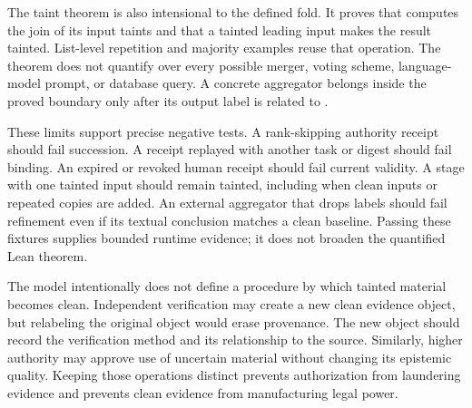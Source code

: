 The taint theorem is also intensional to the defined fold. It proves that  computes the join of its input taints and that a tainted leading input makes the result tainted. List-level repetition and majority examples reuse that operation. The theorem does not quantify over every possible merger, voting scheme, language-model prompt, or database query. A concrete aggregator belongs inside the proved boundary only after its output label is related to .

These limits support precise negative tests. A rank-skipping authority receipt should fail succession. A receipt replayed with another task or digest should fail binding. An expired or revoked human receipt should fail current validity. A stage with one tainted input should remain tainted, including when clean inputs or repeated copies are added. An external aggregator that drops labels should fail refinement even if its textual conclusion matches a clean baseline. Passing these fixtures supplies bounded runtime evidence; it does not broaden the quantified Lean theorem.

The model intentionally does not define a procedure by which tainted material becomes clean. Independent verification may create a new clean evidence object, but relabeling the original object would erase provenance. The new object should record the verification method and its relationship to the source. Similarly, higher authority may approve use of uncertain material without changing its epistemic quality. Keeping those operations distinct prevents authorization from laundering evidence and prevents clean evidence from manufacturing legal power.
